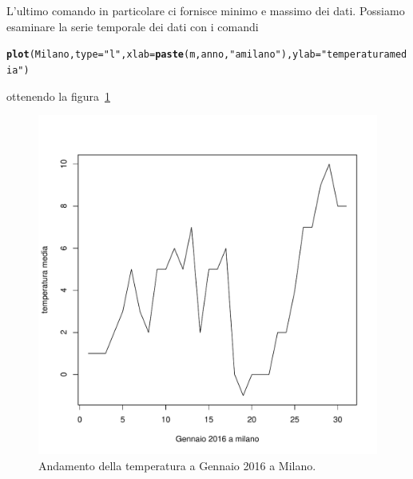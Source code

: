 \documentclass[onecolumn,12pt]{book}\usepackage[]{graphicx}\usepackage[]{color}
\makeatletter
\def\maxwidth{ %
  \ifdim\Gin@nat@width>\linewidth
    \linewidth
  \else
    \Gin@nat@width
  \fi
}
\newcommand{\hlstr}[1]{\textcolor[rgb]{0.192,0.494,0.8}{#1}}%
\newcommand{\hlstd}[1]{\textcolor[rgb]{0.345,0.345,0.345}{#1}}%
\newcommand{\hlkwc}[1]{\textcolor[rgb]{0.333,0.667,0.333}{#1}}%
\newcommand{\hlkwd}[1]{\textcolor[rgb]{0.737,0.353,0.396}{\textbf{#1}}}%
\newenvironment{kframe}{%
 \def\at@end@of@kframe{}%
 \ifinner\ifhmode%
  \def\at@end@of@kframe{\end{minipage}}%
  \begin{minipage}{\columnwidth}%
 \fi\fi%
 \def\FrameCommand##1{\hskip\@totalleftmargin \hskip-\fboxsep
 \colorbox{shadecolor}{##1}\hskip-\fboxsep
     \hskip-\linewidth \hskip-\@totalleftmargin \hskip\columnwidth}%
 \MakeFramed {\advance\hsize-\width
   \@totalleftmargin\z@ \linewidth\hsize
   \@setminipage}}%
 {\par\unskip\endMakeFramed%
 \at@end@of@kframe}
\newenvironment{knitrout}{}{} %
\makeatother
\begin{document}
L'ultimo comando in particolare ci fornisce minimo e massimo dei dati.
Possiamo esaminare la serie temporale dei dati con i comandi
\begin{knitrout}
\color{fgcolor}\begin{kframe}
\begin{alltt}
\hlkwd{plot}\hlstd{(Milano,}\hlkwc{type}\hlstd{=}\hlstr{"l"}\hlstd{,}\hlkwc{xlab}\hlstd{=}\hlkwd{paste}\hlstd{(m,anno,} \hlstr{"a milano"}\hlstd{),}\hlkwc{ylab}\hlstd{=}\hlstr{"temperatura media"}\hlstd{)}
\end{alltt}
\end{kframe}
\end{knitrout}
ottenendo la figura~\ref{fig:datiist}
\begin{figure}[htbp]
\begin{center}
\begin{knitrout}
\color{fgcolor}
\includegraphics[width=\maxwidth]{figure/unnamed-chunk-99-1} 

\end{knitrout}
\caption{ Andamento della temperatura a Gennaio 2016  a Milano. }
\label{fig:datiist}
\end{center}
\end{figure}
\end{document}
